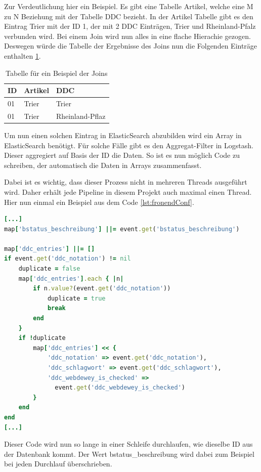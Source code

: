 Zur Verdeutlichung hier ein Beispiel.
Es gibt eine Tabelle Artikel, welche eine M zu N Beziehung mit der Tabelle DDC bezieht. In der Artikel Tabelle gibt es den Eintrag Trier mit der ID 1, der mit 2 DDC Einträgen, Trier und Rheinland-Pfalz verbunden wird. Bei einem Join wird nun alles in eine flache Hierachie gezogen. Deswegen würde die Tabelle der Ergebnisse des Joins nun die Folgenden Einträge enthalten \ref{tbl:join}.

\begin{table} %
	\centering
		\begin{tabular}{l | l | l}
		    \textbf{ID} & \textbf{Artikel} & \textbf{DDC} \\
        \hline
        01 & Trier & Trier \\
        01 & Trier & Rheinland-Pflaz  \\
		\end{tabular}
    \caption{Tabelle für ein Beispiel der Joins}
    \label{tbl:join}
\end{table}

Um nun einen solchen Eintrag in ElasticSearch abzubilden wird ein Array in ElasticSearch benötigt. Für solche Fälle gibt es den Aggregat-Filter in Logstash. Dieser aggregiert auf Basis der ID die Daten. So ist es nun möglich Code zu schreiben, der automatisch die Daten in Arrays zusammenfasst.

Dabei ist es wichtig, dass dieser Prozess nicht in mehreren Threads ausgeführt wird. Daher erhält jede Pipeline in diesem Projekt auch maximal einen Thread.
Hier nun einmal ein Beispiel aus dem Code \ref{lst:fronendConf}.


\begin{lstlisting}[language=Ruby, frame=single, label={lst:fronendConf}] 
[...]
map['bstatus_beschreibung'] ||= event.get('bstatus_beschreibung')

map['ddc_entries'] ||= []
if event.get('ddc_notation') != nil
    duplicate = false
    map['ddc_entries'].each { |n|
        if n.value?(event.get('ddc_notation'))
            duplicate = true
            break
        end
    }
    if !duplicate
        map['ddc_entries'] << {
            'ddc_notation' => event.get('ddc_notation'),
            'ddc_schlagwort' => event.get('ddc_schlagwort'),
            'ddc_webdewey_is_checked' => 
              event.get('ddc_webdewey_is_checked')
        }
    end
end
[...]
\end{lstlisting}

Dieser Code wird nun so lange in einer Schleife durchlaufen, wie dieselbe ID aus der Datenbank kommt. Der Wert bstatus\_beschreibung wird dabei zum Beispiel bei jeden Durchlauf überschrieben. 

